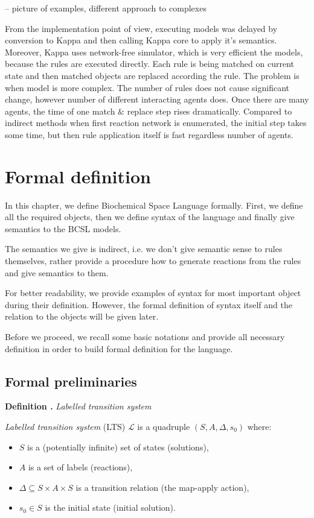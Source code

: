 \documentclass[12pt]{fithesis2}
\newcounter{counter}[section]
\renewcommand{\thecounter}{\thesection.\arabic{counter}}
\newenvironment{definition}[1]{\bigskip\refstepcounter{counter}\noindent\textbf{Definition \thecounter } \textit{#1} \par\nopagebreak}{\bigskip}
\begin{document}
-- picture of examples, different approach to complexes

From the implementation point of view, executing models was delayed by conversion to Kappa and then calling Kappa core to apply it's semantics. Moreover, Kappa uses network-free simulator, which is very efficient the models, because the rules are executed directly. Each rule is being matched on current state and then matched objects are replaced according the rule. The problem is when model is more complex. The number of rules does not cause significant change, however number of different interacting agents does. Once there are many agents, the time of one match \& replace step rises dramatically. Compared to indirect methods when first reaction network is enumerated, the initial step takes some time, but then rule application itself is fast regardless number of agents.

\chapter{Formal definition}
\label{formal_definition}

In this chapter, we define Biochemical Space Language formally. First, we define all the required objects, then we define syntax of the language and finally give semantics to the BCSL models.

The semantics we give is indirect, i.e. we don't give semantic sense to rules themselves, rather provide a procedure how to generate reactions from the rules and give semantics to them.

For better readability, we provide examples of syntax for most important object during their definition. However, the formal definition of syntax itself and the relation to the objects will be given later.

Before we proceed, we recall some basic notations and provide all necessary definition in order to build formal definition for the language.

\section{Formal preliminaries}

\begin{definition}{Labelled transition system}\label{lts}
\textit{Labelled transition system} (LTS) $\mathcal{L}$ is a quadruple $(S, A, \Delta, s_0)$ where:

\begin{itemize}
  \item $S$ is a (potentially infinite) set of states (solutions),
  \item $A$ is a set of labels (reactions),
  \item $\Delta \subseteq S \times A \times S$ is a transition relation (the map-apply action),
  \item $s_0 \in S$ is the initial state (initial solution).
\end{itemize}
\end{definition}
\end{document}
